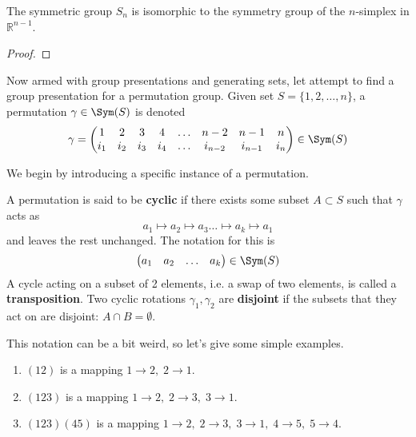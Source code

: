   \begin{theorem}
    The symmetric group $S_n$ is isomorphic to the symmetry group of the $n$-simplex in $\mathbb{R}^{n-1}$. 
  \end{theorem}
  \begin{proof}
    
  \end{proof}

  Now armed with group presentations and generating sets, let attempt to find a group presentation for a permutation group. Given set $S = \{1, 2, \ldots, n\}$, a permutation $\gamma \in \Sym(S)$ is denoted 
  \begin{equation}
    \gamma = \begin{pmatrix} 
      1 & 2 & 3 & 4 & \ldots & n-2 & n-1 & n \\ 
      i_1 & i_2 & i_3 & i_4 & \ldots & i_{n-2} & i_{n-1} & i_n 
    \end{pmatrix} \in \Sym(S)
  \end{equation} 

  We begin by introducing a specific instance of a permutation. 

  \begin{definition}
    A permutation is said to be \textbf{cyclic} if there exists some subset $A \subset S$ such that $\gamma$ acts as 
    \begin{equation}
      a_1 \mapsto a_2 \mapsto a_3 \ldots \mapsto a_k \mapsto a_1
    \end{equation}
    and leaves the rest unchanged. The notation for this is 
    \begin{equation}
      \begin{pmatrix} a_1 & a_2 & \ldots & a_k \end{pmatrix} \in \Sym(S)
    \end{equation}
    A cycle acting on a subset of 2 elements, i.e. a swap of two elements, is called a \textbf{transposition}. Two cyclic rotations $\gamma_1, \gamma_2$ are \textbf{disjoint} if the subsets that they act on are disjoint: $A \cap B = \emptyset$. 
  \end{definition}

  \begin{example}
    This notation can be a bit weird, so let's give some simple examples. 
    \begin{enumerate}
      \item $(1 2)$ is a mapping $1 \rightarrow 2,\; 2 \rightarrow 1$. 
      \item $(1 2 3)$ is a mapping $1\rightarrow 2,\; 2 \rightarrow 3,\; 3 \rightarrow 1$. 
      \item $(1 2 3) (4 5)$ is a mapping $1\rightarrow 2,\; 2 \rightarrow 3,\; 3 \rightarrow 1, \;4 \rightarrow 5, \;5 \rightarrow 4$. 
    \end{enumerate}
  \end{example}

